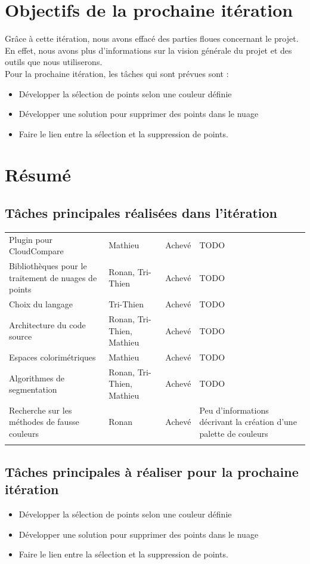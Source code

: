 \documentclass[12pt,titlepage,french]{article}
\begin{document}
\section{Objectifs de la prochaine itération}
Grâce à cette itération, nous avons effacé des parties floues concernant le projet. En effet, nous avons plus d'informations sur la vision générale du projet et des outils que nous utiliserons. \\
Pour la prochaine itération, les tâches qui sont prévues sont :
\begin{itemize}
  \item Développer la sélection de points selon une couleur définie
  \item Développer une solution pour supprimer des points dans le nuage
  \item Faire le lien entre la sélection et la suppression de points.
\end{itemize}

\section{Résumé}
\subsection{Tâches principales réalisées dans l'itération}
\noindent\begin{tabu} to \toprule
  &&&\\\toprule
Plugin pour CloudCompare
& Mathieu
& Achevé
& TODO\\\midrule
Bibliothèques pour le traitement de nuages de points
& Ronan, Tri-Thien
& Achevé
& TODO\\\midrule
Choix du langage
& Tri-Thien
& Achevé
& TODO\\\midrule
Architecture du code source
& Ronan, Tri-Thien, Mathieu
& Achevé
& TODO\\\midrule
Espaces colorimétriques
& Mathieu
& Achevé
& TODO\\\midrule
Algorithmes de segmentation
& Ronan, Tri-Thien, Mathieu
& Achevé
& TODO\\\midrule
Recherche sur les méthodes de fausse couleurs
& Ronan
& Achevé
& Peu d'informations décrivant la création d'une palette de couleurs\\\bottomrule  \\
\end{tabu}

\subsection{Tâches principales à réaliser pour la prochaine itération}
\begin{itemize}
  \item Développer la sélection de points selon une couleur définie
  \item Développer une solution pour supprimer des points dans le nuage
  \item Faire le lien entre la sélection et la suppression de points.
\end{itemize}
\end{document}

